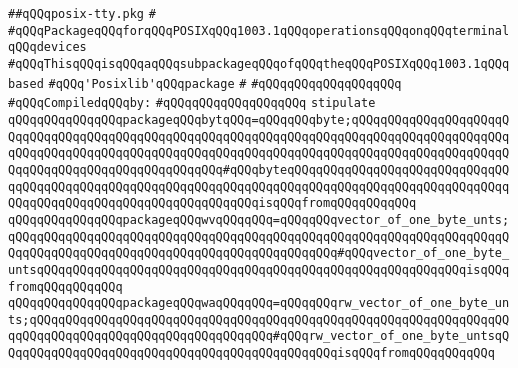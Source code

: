 \label{src/lib/std/src/psx/posix-tty.pkg}
\verb|##qQQqposix-tty.pkg|\newline
\verb|#|\newline
\verb|#qQQqPackageqQQqforqQQqPOSIXqQQq1003.1qQQqoperationsqQQqonqQQqterminalqQQqdevices|\newline
\verb|#qQQqThisqQQqisqQQqaqQQqsubpackageqQQqofqQQqtheqQQqPOSIXqQQq1003.1qQQqbased|\newline
\verb|#qQQq'Posixlib'qQQqpackage|\newline
\verb|#|\newline
\verb|#qQQqqQQqqQQqqQQqqQQq|\newline
\newline
\verb|#qQQqCompiledqQQqby:|\newline
\verb|#qQQqqQQqqQQqqQQqqQQq|\newline
\newline
\newline
\newline
\newline
\verb|stipulate|\newline
\verb|qQQqqQQqqQQqqQQqpackageqQQqbytqQQq=qQQqqQQqbyte;qQQqqQQqqQQqqQQqqQQqqQQqqQQqqQQqqQQqqQQqqQQqqQQqqQQqqQQqqQQqqQQqqQQqqQQqqQQqqQQqqQQqqQQqqQQqqQQqqQQqqQQqqQQqqQQqqQQqqQQqqQQqqQQqqQQqqQQqqQQqqQQqqQQqqQQqqQQqqQQqqQQqqQQqqQQqqQQqqQQqqQQqqQQqqQQq#qQQqbyteqQQqqQQqqQQqqQQqqQQqqQQqqQQqqQQqqQQqqQQqqQQqqQQqqQQqqQQqqQQqqQQqqQQqqQQqqQQqqQQqqQQqqQQqqQQqqQQqqQQqqQQqqQQqqQQqqQQqqQQqqQQqqQQqqQQqqQQqisqQQqfromqQQqqQQqqQQq|\newline
\verb|qQQqqQQqqQQqqQQqpackageqQQqwvqQQqqQQq=qQQqqQQqvector_of_one_byte_unts;qQQqqQQqqQQqqQQqqQQqqQQqqQQqqQQqqQQqqQQqqQQqqQQqqQQqqQQqqQQqqQQqqQQqqQQqqQQqqQQqqQQqqQQqqQQqqQQqqQQqqQQqqQQqqQQqqQQq#qQQqvector_of_one_byte_untsqQQqqQQqqQQqqQQqqQQqqQQqqQQqqQQqqQQqqQQqqQQqqQQqqQQqqQQqqQQqisqQQqfromqQQqqQQqqQQq|\newline
\verb|qQQqqQQqqQQqqQQqpackageqQQqwaqQQqqQQq=qQQqqQQqrw_vector_of_one_byte_unts;qQQqqQQqqQQqqQQqqQQqqQQqqQQqqQQqqQQqqQQqqQQqqQQqqQQqqQQqqQQqqQQqqQQqqQQqqQQqqQQqqQQqqQQqqQQqqQQqqQQqqQQq#qQQqrw_vector_of_one_byte_untsqQQqqQQqqQQqqQQqqQQqqQQqqQQqqQQqqQQqqQQqqQQqqQQqisqQQqfromqQQqqQQqqQQq|\newline

